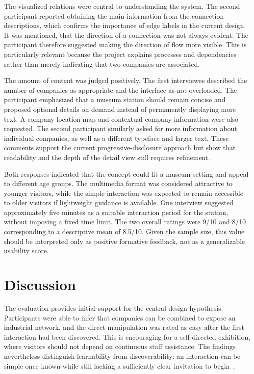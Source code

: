\documentclass[sigconf,nonacm]{acmart}
\begin{document}
The visualized relations were central to understanding the system. The second participant reported obtaining the main information from the connection descriptions, which confirms the importance of edge labels in the current design. It was mentioned, that the direction of a connection was not always evident. The participant therefore suggested making the direction of flow more visible. This is particularly relevant because the project explains processes and dependencies rather than merely indicating that two companies are associated.

The amount of content was judged positively. The first interviewee described the number of companies as appropriate and the interface as not overloaded. The participant emphasized that a museum station should remain concise and proposed optional details on demand instead of permanently displaying more text. A company location map and contextual company information were also requested. The second participant similarly asked for more information about individual companies, as well as a different typeface and larger text. These comments support the current progressive-disclosure approach but show that readability and the depth of the detail view still requires refinement.

Both responses indicated that the concept could fit a museum setting and appeal to different age groups. The multimedia format was considered attractive to younger visitors, while the simple interaction was expected to remain accessible to older visitors if lightweight guidance is available. One interview suggested approximately five minutes as a suitable interaction period for the station, without imposing a fixed time limit. The two overall ratings were 9/10 and 8/10, corresponding to a descriptive mean of 8.5/10. Given the sample size, this value should be interpreted only as positive formative feedback, not as a generalizable usability score.

\section{Discussion}

The evaluation provides initial support for the central design hypothesis. Participants were able to infer that companies can be combined to expose an industrial network, and the direct manipulation was rated as easy after the first interaction had been discovered. This is encouraging for a self-directed exhibition, where visitors should not depend on continuous staff assistance. The findings nevertheless distinguish learnability from discoverability: an interaction can be simple once known while still lacking a sufficiently clear invitation to begin~\cite{norman2008,norman2010}.
\end{document}
